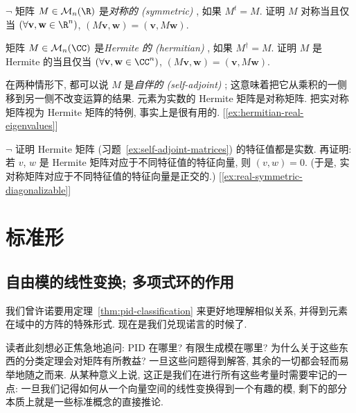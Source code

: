 \begin{prob}\label{ex:self-adjoint-matrices}
$\neg$ 矩阵 $M\in\mathcal{M}_n(\R)$ 是\emph{对称的 (symmetric)}
, 如果 $M^t=M$. 证明 $M$ 对称当且仅当 $(\forall \mathbf{v},\mathbf{w}\in\R^n)$, $(M\mathbf{v},\mathbf{w})=(\mathbf{v},M\mathbf{w})$.

矩阵 $M\in\mathcal{M}_n(\CC)$ 是\emph{Hermite 的 (hermitian)}
, 如果 $M^{\dagger}=M$. 证明 $M$ 是 Hermite 的当且仅当 $(\forall \mathbf{v},\mathbf{w}\in\CC^n)$, $(M\mathbf{v},\mathbf{w})=(\mathbf{v},M\mathbf{w})$.

在两种情形下, 都可以说 $M$ 是\emph{自伴的 (self-adjoint)}
; 这意味着把它从乘积的一侧移到另一侧不改变运算的结果. 元素为实数的 Hermite 矩阵是对称矩阵. 把实对称矩阵视为 Hermite 矩阵的特例, 事实上是很有用的. [\ref{ex:hermitian-real-eigenvalues}]
\end{prob}

\begin{prob}\label{ex:hermitian-real-eigenvalues}
$\neg$ 证明 Hermite 矩阵 (习题~\ref{ex:self-adjoint-matrices}) 的特征值都是实数. 再证明: 若 $v$, $w$ 是 Hermite 矩阵对应于不同特征值的特征向量, 则 $(v,w)=0$. (于是, 实对称矩阵对应于不同特征值的特征向量是正交的.) [\ref{ex:real-symmetric-diagonalizable}]
\end{prob}

\section{标准形}
\label{sec:canonical-forms}

\subsection{自由模的线性变换; 多项式环的作用}
\label{subsec:polyring-action}

我们曾许诺要用定理~\ref{thm:pid-classification} 来更好地理解相似关系, 并得到元素在域中的方阵的特殊形式. 现在是我们兑现诺言的时候了.

读者此刻想必正焦急地追问: PID 在哪里? 有限生成模在哪里? 为什么关于这些东西的分类定理会对矩阵有所教益? 一旦这些问题得到解答, 其余的一切都会轻而易举地随之而来. 从某种意义上说, 这正是我们在进行所有这些考量时需要牢记的一点: 一旦我们记得如何从一个向量空间的线性变换得到一个有趣的模, 剩下的部分本质上就是一些标准概念的直接推论.

